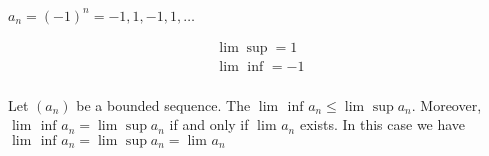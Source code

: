 \begin{eg}
	$a_n = \left( -1 \right)^{n} = -1, 1, -1, 1, \ldots$	

	\begin{align}
		\lim_{} \sup = 1 \\
		\lim_{} \text{ inf } = -1 \\
	\end{align}
\end{eg}

\begin{theorem}
	Let $\left( a_n \right)$ be a bounded sequence. The $\lim_{} \text{ inf } a_n \le \lim_{} \sup a_n$. Moreover, $\lim_{} \text{ inf } a_n = \lim_{} \sup a_n$ if and only if $\lim_{} a_n$ exists. In this case we have $\lim_{} \text{ inf } a_n = \lim_{} \sup a_n = \lim_{} a_n$
\end{theorem}

